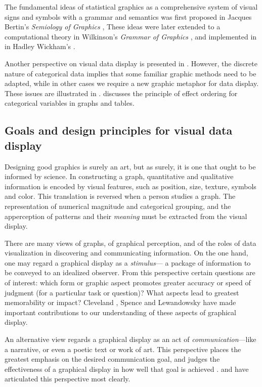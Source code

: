 \documentclass[11pt]{book}
\begin{document}
The fundamental ideas of statistical graphics as a comprehensive system
of visual signs and symbols with a grammar and semantics was first proposed
in Jacques Bertin's \emph{Semiology of Graphics} \citeyearpar{Bertin:83}, 
These ideas were later extended to a computational theory
in Wilkinson's \emph{Grammar of Graphics} \citeyearpar{Wilkinson:2005},
and implemented in \R in Hadley Wickham's 
\citep{Wickham:2009:ggplot2,ggplot2}.

Another perspective on visual data display is presented in .
However, the discrete nature of categorical data implies that
some familiar graphic methods need to be adapted, while in other
cases we require a new graphic metaphor for data display.
These issues are illustrated in .
 discusses the principle of effect ordering
for categorical variables in graphs and tables.

\subsection{Goals and design principles for visual data display}\label{sec:intro-goals}

Designing good graphics is surely an art, but as surely, it is
one that ought to be informed by science.
In constructing a graph, quantitative and qualitative information is
encoded by visual features, such as position, size, texture, symbols
and color. This translation is reversed when a person studies a
graph. The representation of numerical magnitude and categorical
grouping, and the apperception of patterns and their \emph{meaning} must be extracted from the visual display.  

There are many views of graphs, of graphical perception, and of
the roles of data visualization in discovering and communicating
information.
On the one hand, one may regard a graphical display as a \emph{stimulus}---
a package of information to be conveyed to an idealized observer.
From this perspective certain questions are of interest:  which
form or graphic aspect promotes greater accuracy or speed of judgment
(for a particular task or question)?  What aspects lead to greatest
memorability or impact? 
Cleveland \citep{ClevelandMcGill:84b,ClevelandMcGill:85,Cleveland:93:JCGS},
Spence and Lewandowsky 
\citep{LewandowskySpence:89,Spence:90,SpenceLewandowsky:90} have made important contributions to our understanding of
these aspects of graphical display.

An alternative view regards a graphical display as an act
of \emph{communication}---like a narrative, or even a poetic text or work of art. 
This perspective places the greatest emphasis on the desired
communication goal, and judges the effectiveness of a graphical
display in how well that goal is achieved \citep{FriendlyKwan:2011}.
\citet{Kosslyn:85,Kosslyn:89} and \citet{Tufte:83,Tufte:90,Tufte:97}
have articulated this perspective most clearly.
\end{document}
